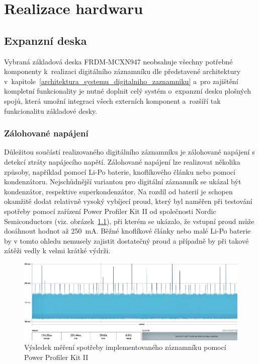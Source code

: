 
\chapter{Realizace hardwaru}
\label{realizace_hardwaru}

\section{Expanzní deska}
\label{expanzni_deska}
Vybraná základová deska FRDM-MCXN947 neobsahuje všechny potřebné komponenty k~realizaci digitálního záznamníku dle představené architektury v~kapitole~\ref{architektura_systemu_digitalniho_zaznamniku} a~pro zajištění kompletní funkcionality je nutné doplnit celý systém o~expanzní desku plošných spojů, která umožní integraci všech externích komponent a~rozšíří tak funkcionalitu základové desky.

\subsection{Zálohované napájení}
\label{zalohovane_napajeni_hw}
Důležitou součástí realizovaného digitálního záznamníku je zálohované napájení s detekcí ztráty napájecího napětí. Zálohované napájení lze realizovat několika způsoby, například pomocí Li-Po baterie, knoflíkového článku nebo pomocí kondenzátoru. Nejschůdnější variantou pro digitální záznamník se ukázal být kondenzátor, respektive superkondenzátor. Na rozdíl od baterií je schopen okamžitě dodat relativně vysoký vybíjecí proud, který byl naměřen při testování spotřeby pomocí zařízení Power Profiler Kit II od společnosti Nordic Semiconductors (viz. obrázek~\ref{fig:power-consumption}), při kterém se ukázalo, že vstupní proud může dosáhnout hodnot až \SI{250}{\milli\ampere}. Běžné knoflíkové články nebo malé Li-Po baterie by v tomto ohledu nemusely zajistit dostatečný proud a případně by při takové zátěži vedly k velmi krátké výdrži.

\begin{figure}[h]
    \centering
    \includegraphics[width=1.00\textwidth]{obrazky-figures/power-consumption-4.jpg}
    
    \caption{Výsledek měření spotřeby implementovaného záznamníku pomocí Power Profiler Kit II}
    \label{fig:power-consumption}
\end{figure}

